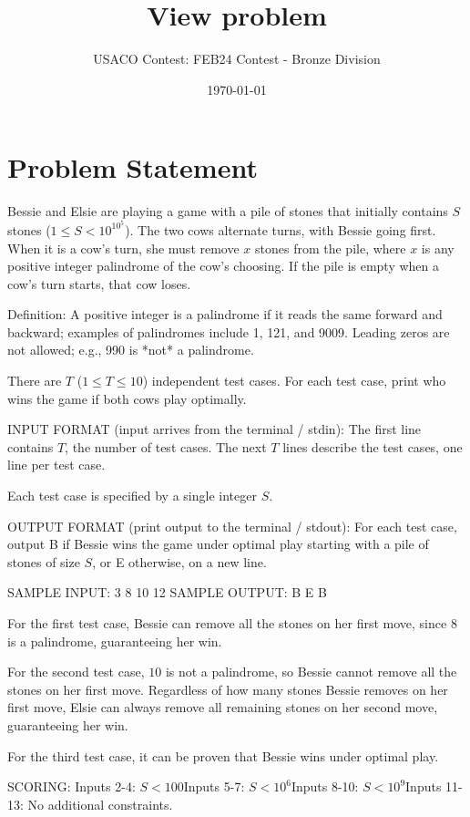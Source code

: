 \documentclass[12pt]{article}
\title{View problem}
\author{USACO Contest: FEB24 Contest - Bronze Division}
\date{\today}
\begin{document}
\maketitle

\section*{Problem Statement}


Bessie and Elsie are playing a game with a pile of stones that initially
contains $S$ stones ($1\le S<10^{10^5}$). The two cows alternate turns,  with
Bessie going first. When it is a cow's turn, she must remove $x$ stones from the
pile, where $x$ is any positive integer palindrome of the cow's choosing. If the
pile is empty when a cow's turn starts, that cow loses.

Definition: A positive integer is a palindrome if it reads the same
forward and backward; examples of palindromes include 1, 121, and 9009. Leading
zeros are not allowed; e.g., 990 is *not* a palindrome.

There are $T$ ($1\le T\le 10$) independent test cases. For each test case, 
print who wins the game if both cows play optimally.

INPUT FORMAT (input arrives from the terminal / stdin):
The first line contains $T$, the number of test cases. The next $T$ lines
describe the test cases, one line per test case.

Each test case is specified by a single integer $S$.

OUTPUT FORMAT (print output to the terminal / stdout):
For each test case, output B if Bessie wins the game under optimal play starting
with a pile of stones of size $S$, or E otherwise, on a new line.

SAMPLE INPUT:
3
8
10
12
SAMPLE OUTPUT: 
B
E
B

For the first test case, Bessie can remove all the stones on her first move,
since $8$ is a palindrome, guaranteeing her win.

For the second test case, $10$ is not a palindrome, so Bessie cannot remove all
the stones on her first move. Regardless of how many stones  Bessie removes on
her first move, Elsie can always remove all remaining stones on her second move,
guaranteeing her win.

For the third test case, it can be proven that Bessie wins under optimal play.

SCORING:
Inputs 2-4: $S<100$Inputs 5-7: $S<10^6$Inputs 8-10: $S<10^9$Inputs 11-13: No additional constraints.
\end{document}
